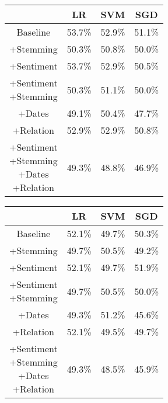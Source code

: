 \documentclass[11pt,a4paper]{article}
\begin{document}
\begin{center}
\begin{tabular}{ |c|c|c|c| }
 \hline
  & LR & SVM & SGD \\
  \hline
  Baseline & 53.7\% & 52.9\% & 51.1\% \\
  \hline
 +Stemming & 50.3\% & 50.8\% & 50.0\% \\
  \hline
 +Sentiment & 53.7\% & 52.9\% & 50.5\% \\
  \hline
  \shortstack{+Sentiment \\ +Stemming} & 50.3\% & 51.1\% & 50.0\%\\
 \hline
 +Dates & 49.1\% & 50.4\% & 47.7\% \\
  \hline
 +Relation & 52.9\% & 52.9\% & 50.8\% \\
  \hline
  \shortstack{+Sentiment \\ +Stemming \\+Dates \\+Relation} & 49.3\% & 48.8\% & 46.9\% \\
 \hline
\end{tabular}
\end{center}

\vspace{40mm}
\begin{center}
\begin{tabular}{ |c|c|c|c| }
 \hline
  & LR & SVM & SGD \\
  \hline
  Baseline & 52.1\% & 49.7\% & 50.3\% \\
  \hline
 +Stemming & 49.7\% & 50.5\% & 49.2\% \\
  \hline
 +Sentiment & 52.1\% & 49.7\% & 51.9\% \\
  \hline
  \shortstack{+Sentiment \\ +Stemming} & 49.7\% & 50.5\% & 50.0\%\\
 \hline
 +Dates & 49.3\% & 51.2\% & 45.6\% \\
  \hline
 +Relation & 52.1\% & 49.5\% & 49.7\% \\
  \hline
  \shortstack{+Sentiment \\ +Stemming \\+Dates \\+Relation} & 49.3\% & 48.5\% & 45.9\% \\
 \hline
\end{tabular}
\end{center}
\end{document}
